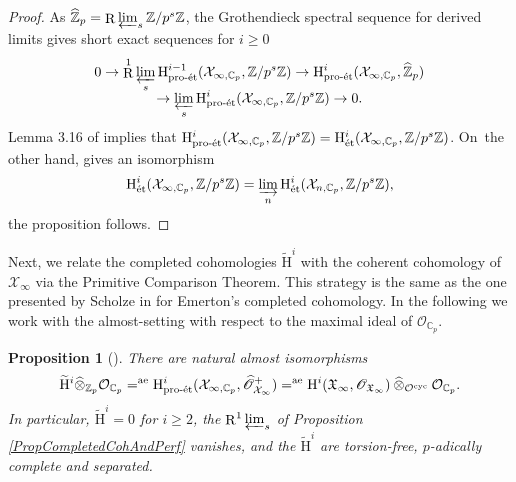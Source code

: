 \documentclass[JEP,XML,SOM,Unicode,published]{cedram}
\newcommand{\rae}{\mathrm{ae}}
\newcommand{\cyc}{\mathrm{cyc}}
\newcommand{\et}{\mathrm{\acute{e}t}}
\newcommand{\proet}{\mathrm{pro}\textup{-}\et}
\newcommand{\wotimes}{\mathbin{\widehat\otimes}}
\numberwithin{equation}{section}
\newtheorem{prop}{Proposition}[section]
\theoremstyle{definition}
\newcommand{\bb}[1]{\mathbb{#1}}
\newcommand{\n}[1]{\mathcal{#1}}
\newcommand{\f}[1]{\mathfrak{#1}}
\newcommand{\s}[1]{\mathscr{#1}}
\DeclareMathOperator{\R}{R}
\begin{document}
\begin{proof}
As $\widehat{\bb{Z}}_p = \R \varprojlim_s \bb{Z}/p^s \bb{Z}$, the Grothendieck spectral sequence for derived limits gives short exact sequences for $i\geq 0$\vspace*{-3pt}
\begin{multline*}
0\to \R^1 \varprojlim_s \mathrm{H}^{i-1}_{\proet}(\n{X}_{\infty, \bb{C}_p}, \bb{Z}/p^s \bb{Z}) \to \mathrm{H}^i_{\proet}(\n{X}_{\infty, \bb{C}_p}, \widehat{\bb{Z}}_p)\\[-5pt]
\to \varprojlim_s \mathrm{H}^{i}_{\proet}(\n{X}_{\infty, \bb{C}_p}, \bb{Z}/p^s \bb{Z}) \to 0.
\end{multline*}
Lemma 3.16 of \cite{MR3090230} implies that $\mathrm{H}^{i}_{\proet}(\n{X}_{\infty, \bb{C}_p}, \bb{Z}/p^s \bb{Z}) =\mathrm{H}^{i}_{\et}(\n{X}_{\infty, \bb{C}_p}, \bb{Z}/p^s \bb{Z}) $. On~the other hand, \cite[Cor.\,7.18]{MR3090258} gives an isomorphism
\[
\mathrm{H}_{\et}^i(\n{X}_{\infty, \bb{C}_p}, \bb{Z}/p^s\bb{Z})= \varinjlim_{n} \mathrm{H}_{\et}^i(\n{X}_{n, \bb{C}_p}, \bb{Z}/p^s\bb{Z}),
\]
the proposition follows.
\end{proof}

Next, we relate the completed cohomologies $\widetilde{\mathrm{H}}^i$ with the coherent cohomology of~$\n{X}_{\infty}$ via the Primitive Comparison Theorem. This strategy is the same as the one presented by Scholze in \cite[Ch.\,IV]{scholzeTorsCoho2015} for Emerton's completed cohomology. In the following we work with the almost-setting with respect to the maximal ideal of $\n{O}_{\bb{C}_p}$.

\begin{prop}[{\cite[Th.\,IV.2.1]{scholzeTorsCoho2015}}]
\label{PropCompletedCoherent}
There are natural almost isomorphisms
\begin{equation}
\label{eqIsopcoho}
\widetilde{\mathrm{H}}^i \widehat{\otimes }_{\bb{Z}_p} \n{O}_{\bb{C}_p} =^{\rae} \mathrm{H}^i_{\proet}(\n{X}_{\infty, \bb{C}_p} , \widehat{\s{O}}^+_{\n{X}_{\infty}}) =^{\rae} \mathrm{H}^i(\f{X}_{\infty}, \s{O}_{\f{X}_{\infty}}) \wotimes_{\n{O}^{\cyc}} \n{O}_{\bb{C}_p}.
\end{equation}
In particular, $\widetilde{\mathrm{H}}^i=0$ for $i\geq 2$, the $\R^1 \varprojlim_s$ of Proposition \ref{PropCompletedCohAndPerf} vanishes, and the $\widetilde{\mathrm{H}}^i$ are torsion-free, $p$-adically complete and separated.
\end{prop}
\end{document}
